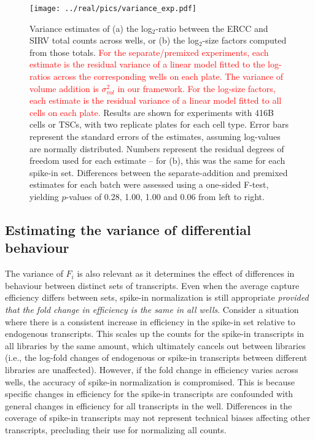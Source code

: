 \documentclass{article}
\newcommand{\revised}[1]{\textcolor{red}{#1}}
\begin{document}
\begin{figure}[btp]
    \begin{center}
        \texttt{[image: ../real/pics/variance\_exp.pdf]}
    \end{center}
    \caption{Variance estimates of (a) the log$_2$-ratio between the ERCC and SIRV total counts across wells, or (b) the log$_2$-size factors computed from those totals.
        \revised{For the separate/premixed experiments, each estimate is the residual variance of a linear model fitted to the log-ratios across the corresponding wells on each plate.
        The variance of volume addition is $\sigma^2_{vol}$ in our framework.
        For the log-size factors, each estimate is the residual variance of a linear model fitted to all cells on each plate.}
        Results are shown for experiments with 416B cells or TSCs, with two replicate plates for each cell type.
        Error bars represent the standard errors of the estimates, assuming log-values are normally distributed.
        Numbers represent the residual degrees of freedom used for each estimate -- for (b), this was the same for each spike-in set.
        Differences between the separate-addition and premixed estimates for each batch were assessed using a one-sided F-test, yielding $p$-values of 0.28, 1.00, 1.00 and 0.06 from left to right.
    }
    \label{fig:varestimates}
\end{figure}

\subsection*{Estimating the variance of differential behaviour}
The variance of $F_i$ is also relevant as it determines the effect of differences in behaviour between distinct sets of transcripts.
Even when the average capture efficiency differs between sets, spike-in normalization is still appropriate \textit{provided that the fold change in efficiency is the same in all wells}.
Consider a situation where there is a consistent increase in efficiency in the spike-in set relative to endogenous transcripts.
This scales up the counts for the spike-in transcripts in all libraries by the same amount, which ultimately cancels out between libraries (i.e., the log-fold changes of endogenous or spike-in transcripts between different libraries are unaffected).
However, if the fold change in efficiency varies across wells, the accuracy of spike-in normalization is compromised.
This is because specific changes in efficiency for the spike-in transcripts are confounded with general changes in efficiency for all transcripts in the well.
Differences in the coverage of spike-in transcripts may not represent technical biases affecting other transcripts, precluding their use for normalizing all counts.
\end{document}
